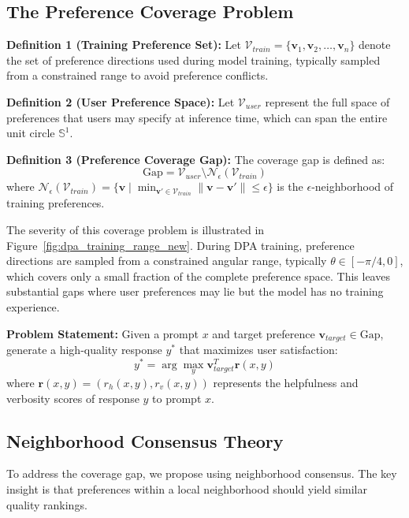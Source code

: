 \documentclass{article} %
\begin{document}
\subsection{The Preference Coverage Problem}

\textbf{Definition 1 (Training Preference Set):} Let $\mathcal{V}_{train} = \{\mathbf{v}_1, \mathbf{v}_2, \ldots, \mathbf{v}_n\}$ denote the set of preference directions used during model training, typically sampled from a constrained range to avoid preference conflicts.

\textbf{Definition 2 (User Preference Space):} Let $\mathcal{V}_{user}$ represent the full space of preferences that users may specify at inference time, which can span the entire unit circle $\mathbb{S}^1$.

\textbf{Definition 3 (Preference Coverage Gap):} The coverage gap is defined as:
\begin{equation}
\text{Gap} = \mathcal{V}_{user} \setminus \mathcal{N}_\epsilon(\mathcal{V}_{train})
\end{equation}
where $\mathcal{N}_\epsilon(\mathcal{V}_{train}) = \{\mathbf{v} \mid \min_{\mathbf{v}' \in \mathcal{V}_{train}} \|\mathbf{v} - \mathbf{v}'\| \leq \epsilon\}$ is the $\epsilon$-neighborhood of training preferences.

The severity of this coverage problem is illustrated in Figure~\ref{fig:dpa_training_range_new}. During DPA training, preference directions are sampled from a constrained angular range, typically $\theta \in [-\pi/4, 0]$, which covers only a small fraction of the complete preference space. This leaves substantial gaps where user preferences may lie but the model has no training experience.

\textbf{Problem Statement:} Given a prompt $x$ and target preference $\mathbf{v}_{target} \in \text{Gap}$, generate a high-quality response $y^*$ that maximizes user satisfaction:
\begin{equation}
y^* = \arg\max_y \mathbf{v}_{target}^T \mathbf{r}(x, y)
\end{equation}
where $\mathbf{r}(x, y) = (r_h(x,y), r_v(x,y))$ represents the helpfulness and verbosity scores of response $y$ to prompt $x$.

\subsection{Neighborhood Consensus Theory}

To address the coverage gap, we propose using neighborhood consensus. The key insight is that preferences within a local neighborhood should yield similar quality rankings.
\end{document}
